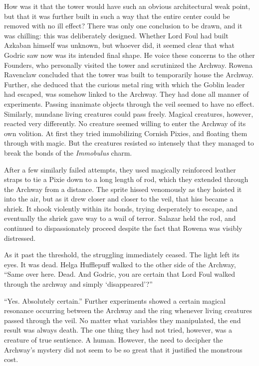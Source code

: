 How was it that the tower would have such an obvious architectural weak point, but that it was further built in such a way that the entire center could be removed with no ill effect? There was only one conclusion to be drawn, and it was chilling: this was deliberately designed. Whether Lord Foul had built Azkaban himself was unknown, but whoever did, it seemed clear that what Godric saw now was its intended final shape.
\SmallVSpace
He voice these concerns to the other Founders, who personally visited the tower and scrutinized the Archway. Rowena Ravenclaw concluded that the tower was built to temporarily house the Archway. Further, she deduced that the curious metal ring with which the Goblin leader had escaped, was somehow linked to the Archway.
\SmallVSpace
They had done all manner of experiments. Passing inanimate objects through the veil seemed to have no effect. Similarly, mundane living creatures could pass freely. Magical creatures, however, reacted very differently. No creature seemed willing to enter the Archway of its own volition. At first they tried immobilizing Cornish Pixies, and floating them through with magic. But the creatures resisted so intensely that they managed to break the bonds of the \emph{Immobulus} charm.

After a few similarly failed attempts, they used magically reinforced leather straps to tie a Pixie down to a long length of rod, which they extended through the Archway from a distance. The sprite hissed venomously as they hoisted it into the air, but as it drew closer and closer to the veil, that hiss became a shriek. It shook violently within its bonds, trying desperately to escape, and eventually the shriek gave way to a wail of terror. Salazar held the rod, and continued to dispassionately proceed despite the fact that Rowena was visibly distressed.

As it past the threshold, the struggling immediately ceased. The light left its eyes. It was dead.
\SmallVSpace
Helga Hufflepuff walked to the other side of the Archway, “Same over here. Dead. And Godric, you are certain that Lord Foul walked through the archway and simply ‘disappeared’?”

“Yes. Absolutely certain.”
\SmallVSpace
Further experiments showed a certain magical resonance occurring between the Archway and the ring whenever living creatures passed through the veil. No matter what variables they manipulated, the end result was always death. The one thing they had not tried, however, was a creature of true sentience. A human. However, the need to decipher the Archway’s mystery did not seem to be so great that it justified the monstrous cost.

